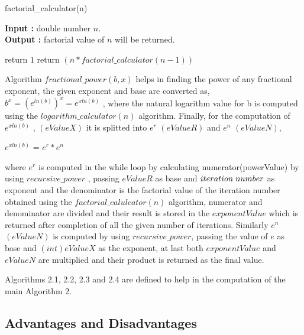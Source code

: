 \documentclass[12pt, a4paper]{article}
\begin{document}
\begin{algorithm}[hbt!]
	\renewcommand{\thealgorithm}{2.4}
	\caption{factorial\_calculator(n)}\label{alg:two}
	
	\hspace*{\algorithmicindent} \textbf{Input : }double number $n$. \\
	\hspace*{\algorithmicindent} \textbf{Output : }factorial value of $n$ will be returned.
	\begin{algorithmic}[1]
		
		\STATE return $1$
		\ENDIF
		\STATE return $ (n * factorial\_calculator(n-1)) $
		
	\end{algorithmic}
\end{algorithm}



\newpage
\noindent
Algorithm $fractional\_power(b,x) $ helps in finding the power of any fractional exponent, the given exponent and base are converted as, $b^x = (e^{ln(b)})^x = e^{xln(b)} $ \cite{Algorithms}, where the natural logarithm value for b is computed using the $logarithm\_calculator(n) $ algorithm. Finally, for the computation of $e^{xln(b)} $ , $(eValueX)$ it is splitted into $e^r$ $(eValueR)$ and $e^n$ $(eValueN)$,

$e^{xln(b)} $ = $e^r * e^n $ 

\noindent
where $e^r$ is computed in the while loop by calculating numerator(powerValue) by using $recursive\_power$ , passing $eValueR$ as base and $iteration \hspace{1mm} number$ as exponent and the denominator is the factorial value of the iteration number obtained using the $factorial\_calulcator(n)$ algorithm, numerator and denominator are divided and their result is stored in the $exponentValue$ which is returned after completion of all the given number of iterations. Similarly $e^n$ $(eValueN)$ is computed by using $recursive\_power$, passing the value of $e$ as base and $(int) eValueX$ as the exponent, at last both $exponentValue$ and $eValueN$ are multiplied and their product is returned as the final value.
 
 
\noindent
Algorithms 2.1, 2.2, 2.3 and 2.4 are defined to help in the computation of the main Algorithm 2.

\subsection{Advantages and Disadvantages}
\end{document}
